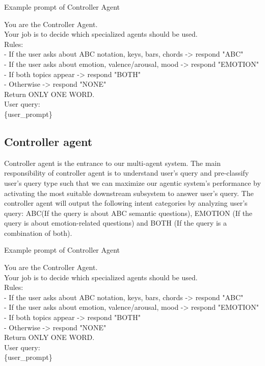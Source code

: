 \documentclass[sigconf]{acmart}
\begin{document}
\begin{promptbox}{Example prompt of Controller Agent}


You are the Controller Agent.\\

Your job is to decide which specialized agents should be used.\\

Rules:\\
- If the user asks about ABC notation, keys, bars, chords -> respond "ABC"\\
- If the user asks about emotion, valence/arousal, mood -> respond "EMOTION"\\
- If both topics appear -> respond "BOTH"\\
- Otherwise -> respond "NONE"\\

Return ONLY ONE WORD.\\

User query:\\
\{user\_prompt\}\\
\end{promptbox}




\subsection{Controller agent}
Controller agent is the entrance to our multi-agent system. The main responsibility of controller agent is to understand user’s query and pre-classify user’s  query type such that we can maximize our agentic system’s performance by activating the most suitable downstream subsystem to answer user’s query. The controller agent will output the following intent categories by analyzing user’s query: ABC(If the query is about ABC semantic questions), EMOTION (If the query is about emotion-related questions) and BOTH (If the query is a combination of both). 

\begin{promptbox}{Example prompt of Controller Agent}


You are the Controller Agent.\\

Your job is to decide which specialized agents should be used.\\

Rules:\\
- If the user asks about ABC notation, keys, bars, chords -> respond "ABC"\\
- If the user asks about emotion, valence/arousal, mood -> respond "EMOTION"\\
- If both topics appear -> respond "BOTH"\\
- Otherwise -> respond "NONE"\\

Return ONLY ONE WORD.\\

User query:\\
\{user\_prompt\}\\
\end{promptbox}
\end{document}
